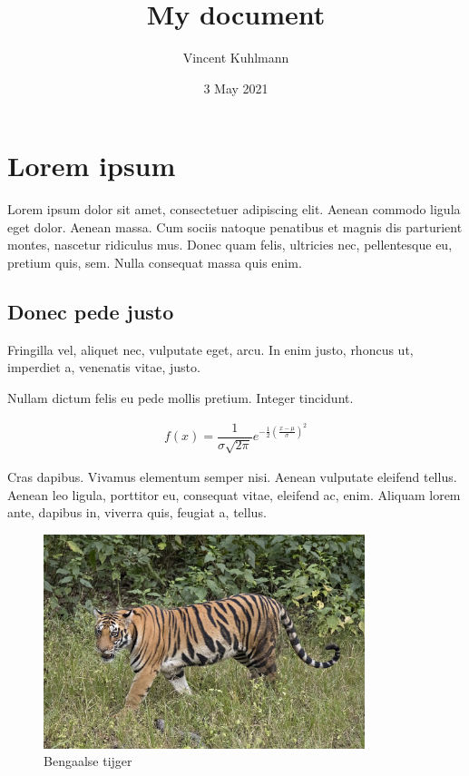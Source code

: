 \documentclass[a4paper]{article}
\title{My document}
\author{Vincent Kuhlmann}
\date{3 May 2021}
\begin{document}
	\maketitle
	
	\section{Lorem ipsum}
	
	Lorem ipsum dolor sit amet, consectetuer adipiscing elit. Aenean commodo ligula eget dolor. Aenean massa. Cum sociis natoque penatibus et magnis dis parturient montes, nascetur ridiculus mus. Donec quam felis, ultricies nec, pellentesque eu, pretium quis, sem. Nulla consequat massa quis enim.
	
	\subsection{Donec pede justo}
	
	Fringilla vel, aliquet nec, vulputate eget, arcu. In enim justo, rhoncus ut, imperdiet a, venenatis vitae, justo.
	
	Nullam dictum felis eu pede mollis pretium. Integer tincidunt.
	
	\begin{align}
		f(x) = \dfrac{1}{\sigma\sqrt{2\pi}}e^{-\frac{1}{2}\left(\frac{x-\mu}{\sigma}\right)^2}
	\end{align}

	Cras dapibus. Vivamus elementum semper nisi. Aenean vulputate eleifend tellus. Aenean leo ligula, porttitor eu, consequat vitae, eleifend ac, enim. Aliquam lorem ante, dapibus in, viverra quis, feugiat a, tellus.
	
	\begin{figure}[h]
		\centering
		\includegraphics[width=9.37cm]{../bengalTigerWikipedia.jpg}
		\caption{Bengaalse tijger}\label{fig:benTijger}
	\end{figure}
	
\end{document}
